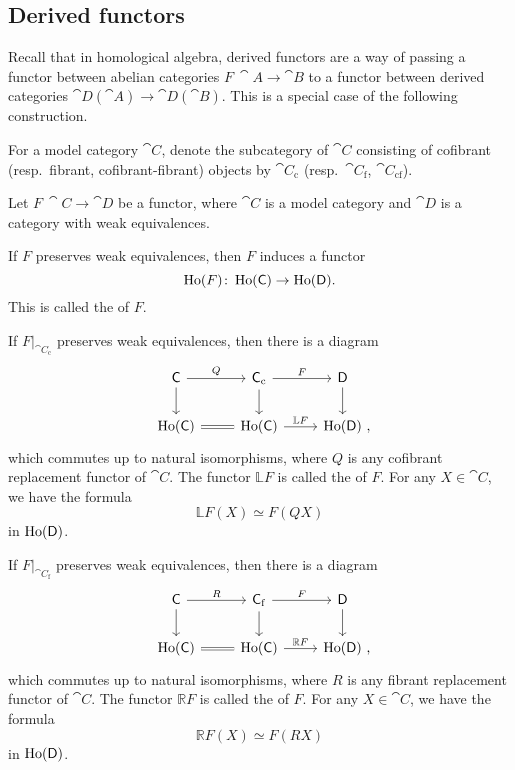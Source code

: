 \subsection{Derived functors}

Recall that in homological algebra,
derived functors are a way of passing a functor
between abelian categories $F\:\cat{A}\to\cat{B}$
to a functor between derived categories $\cat{D}(\cat{A})\to\cat{D}(\cat{B})$.
This is a special case of the following construction.

For a model category $\cat C$,
denote the subcategory of $\cat C$
consisting of cofibrant (resp.\ fibrant, cofibrant-fibrant) objects
by $\cat C_{\mathrm c}$ (resp.\ $\cat C_{\mathrm f}$, $\cat C_{\mathrm{cf}}$).

\begin{definition}
    Let $F\:\cat C\to\cat D$ be a functor,
    where $\cat C$ is a model category and 
    $\cat D$ is a category with weak equivalences.
    \begin{itms}
        \item If $F$ preserves weak equivalences, then $F$ induces a functor
        \[ \operatorname{Ho}(F)\colon\operatorname{Ho}(\mathsf{C})\to\operatorname{Ho}(\mathsf{D}). \]
        This is called the  of $F$.
        \item If $F|_{\cat C_{\mathrm c}}$ preserves weak equivalences,
        then there is a diagram
        \[\begin{tikzcd}
            \cat C\ar[d]\ar[r,"Q"] & \cat C_{\mathrm c}\ar[d]\ar[r,"F"] & \cat D\ar[d] \\
            \Ho(\cat C)\ar[r,equals] & \Ho(\cat C)\ar[r,"\mathbb LF"]
            & \Ho(\cat D)\rlap{\ ,}
        \end{tikzcd}\]
        which commutes up to natural isomorphisms,
        where $Q$ is any cofibrant replacement functor of $\cat C$.
        The functor $\mathbb LF$ is called the  of $F$.
        For any $X\in\cat C$, we have the formula
        \[ \mathbb LF(X)\simeq F(QX) \]
        in $\operatorname{Ho}(\mathsf{D})$.
        \item If $F|_{\cat C_{\mathrm f}}$ preserves weak equivalences,
        then there is a diagram
        \[\begin{tikzcd}
            \cat C\ar[d]\ar[r,"R"] & \cat C_{\mathrm f}\ar[d]\ar[r,"F"] & \cat D\ar[d] \\
            \Ho(\cat C)\ar[r,equals] & \Ho(\cat C)\ar[r,"\mathbb RF"]
            & \Ho(\cat D)\rlap{\ ,}
        \end{tikzcd}\]
        which commutes up to natural isomorphisms,
        where $R$ is any fibrant replacement functor of $\cat C$.
        The functor $\mathbb RF$ is called the  of $F$.
        For any $X\in\cat C$, we have the formula
        \[ \mathbb RF(X)\simeq F(RX) \]
        in $\operatorname{Ho}(\mathsf{D})$.
    \end{itms}
\end{definition}

